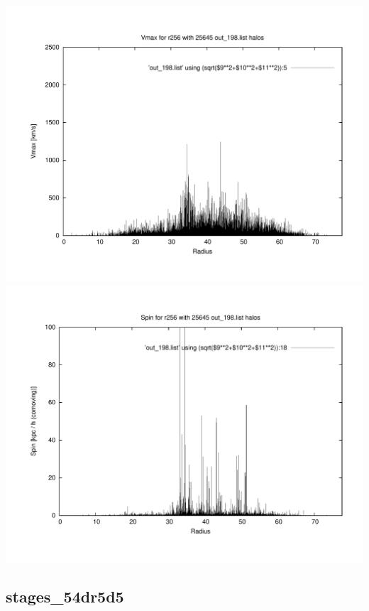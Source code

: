 \includegraphics[scale=0.3]{r256/stages_52/plot_Vmax_out_198.pdf}
\includegraphics[scale=0.3]{r256/stages_52/plot_spin_out_198.pdf}


% 
%
%
%
%
%
%
%


\newpage
\subsection{stages\_54dr5d5}

% 
% 
% 
% 
% 
%
%
%
%
%
%
%


